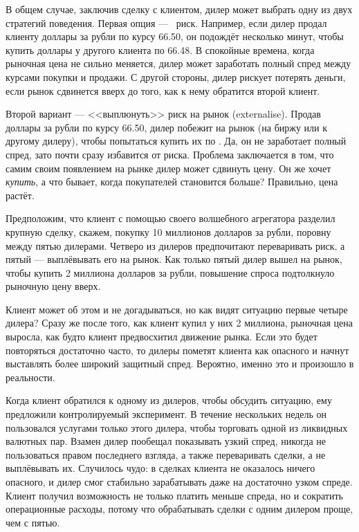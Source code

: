 В общем случае, заключив сделку с клиентом, дилер может выбрать одну из двух
стратегий поведения. Первая опция --- \ риск.
Например, если дилер продал клиенту доллары за рубли по курсу \num{66.50}, он подождёт
несколько минут, чтобы купить доллары у другого клиента по \num{66.48}. В спокойные
времена, когда рыночная цена не сильно меняется, дилер может заработать полный
спред между курсами покупки и продажи. С другой стороны, дилер рискует потерять
деньги, если рынок сдвинется вверх до того, как к нему обратится второй клиент.

Второй вариант --- <<выплюнуть>> риск на рынок (externalise). Продав доллары за
рубли по курсу \num{66.50}, дилер побежит на рынок (на биржу или к другому
дилеру), чтобы попытаться купить их по . Да, он не заработает
полный спред, зато почти сразу избавится от риска. Проблема заключается в том,
что самим своим появлением на рынке дилер может сдвинуть цену. Он же хочет
\emph{купить}, а что бывает, когда покупателей становится больше? Правильно,
цена растёт.

Предположим, что клиент с помощью своего волшебного агрегатора разделил крупную
сделку, скажем, покупку 10 миллионов долларов за рубли, поровну между пятью
дилерами. Четверо из дилеров предпочитают переваривать риск, а пятый ---
выплёвывать его на рынок. Как только пятый дилер вышел на рынок, чтобы купить 2
миллиона долларов за рубли, повышение спроса подтолкнуло рыночную цену вверх.

Клиент может об этом и не догадываться, но как видят ситуацию первые четыре
дилера? Сразу же после того, как клиент купил у них 2 миллиона, рыночная цена
выросла, как будто клиент предвосхитил движение рынка. Если это будет
повторяться достаточно часто, то дилеры пометят клиента как опасного и начнут
выставлять более широкий защитный спред. Вероятно, именно это и произошло в
реальности.

Когда клиент обратился к одному из дилеров, чтобы обсудить ситуацию, ему
предложили контролируемый эксперимент. В течение нескольких недель он
пользовался услугами только этого дилера, чтобы торговать одной из ликвидных
валютных пар. Взамен дилер пообещал показывать узкий спред, никогда не
пользоваться правом последнего взгляда, а также переваривать сделки, а не
выплёвывать их. Случилось чудо: в сделках клиента не оказалось ничего опасного,
и дилер смог стабильно зарабатывать даже на достаточно узком спреде. Клиент
получил возможность не только платить меньше спреда, но и сократить операционные
расходы, потому что обрабатывать сделки с одним дилером проще, чем с пятью.

